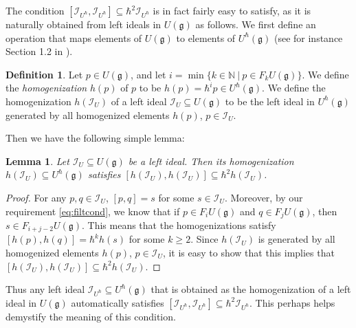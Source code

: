 \documentclass[reqno,oneside,11pt]{amsart}
\theoremstyle{plain}
\newtheorem{lemma}[theorem]{Lemma}
\theoremstyle{definition}
\newtheorem{definition}[theorem]{Definition}
\theoremstyle{remark}
\numberwithin{equation}{section}
\begin{document}
The condition $[\mathcal{I}_{U^\hbar},\mathcal{I}_{U^\hbar}] \subseteq \hbar^2\mathcal{I}_{U^\hbar}$ is in fact fairly easy to satisfy, as it is naturally obtained from left  ideals in $U(\mathfrak{g})$ as follows. We first define an operation that maps elements of $U(\mathfrak{g})$ to elements of $U^\hbar(\mathfrak{g})$ (see for instance Section 1.2 in \cite{SST99}). 

\begin{definition}\label{d:reesation}
Let 
 $p \in U(\mathfrak{g})$, and let  $i = \min\{ k \in \mathbb{N}~|~ p \in F_k U(\mathfrak{g}) \}$. We define the \emph{homogenization} $h(p)$ of $p$ to be $h(p) = \hbar^i p \in U^\hbar(\mathfrak{g})$. We define the homogenization $h(\mathcal{I}_U)$ of a left ideal $\mathcal{I}_U \subseteq U(\mathfrak{g})$ to be the left ideal in $U^\hbar(\mathfrak{g})$ generated by all homogenized elements $h(p)$, $p \in \mathcal{I}_U$. 
 \end{definition}
 
 Then we have the following simple lemma:
 
\begin{lemma}
Let $\mathcal{I}_U \subseteq U(\mathfrak{g})$ be a left ideal. Then its homogenization $h(\mathcal{I}_U) \subseteq U^\hbar(\mathfrak{g})$ satisfies $[ h(\mathcal{I}_U), h(\mathcal{I}_U)] \subseteq \hbar^2 h(\mathcal{I}_U)$.
\end{lemma}

\begin{proof}
For any $p,q \in \mathcal{I}_U$, $[p,q] = s$ for some $s \in \mathcal{I}_U$. Moreover, by our requirement \eqref{eq:filtcond}, we know that if $p \in F_i U(\mathfrak{g})$ and $q \in F_j U(\mathfrak{g})$, then $s \in F_{i+j-2} U(\mathfrak{g})$. This means that the homogenizations satisfy $[h(p),h(q)] = \hbar^k h(s)$ for some $k \geq 2$. Since $h(\mathcal{I}_U)$ is generated by all homogenized elements $h(p)$, $p \in \mathcal{I}_U$, it is easy to show that this implies that $[h(\mathcal{I}_U), h(\mathcal{I}_U)] \subseteq \hbar^2 h(\mathcal{I}_U)$.
\end{proof}

Thus any left ideal $\mathcal{I}_{U^\hbar} \subseteq U^\hbar(\mathfrak{g})$ that is obtained as the homogenization of a left ideal in $U(\mathfrak{g})$ automatically satisfies $[\mathcal{I}_{U^\hbar},\mathcal{I}_{U^\hbar}] \subseteq \hbar^2\mathcal{I}_{U^\hbar}$. This perhaps helps demystify the meaning of this condition.
\end{document}

